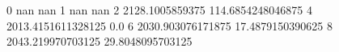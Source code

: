 0 nan nan
1 nan nan
2 2128.1005859375 114.6854248046875
4 2013.4151611328125 0.0
6 2030.903076171875 17.4879150390625
8 2043.219970703125 29.8048095703125

